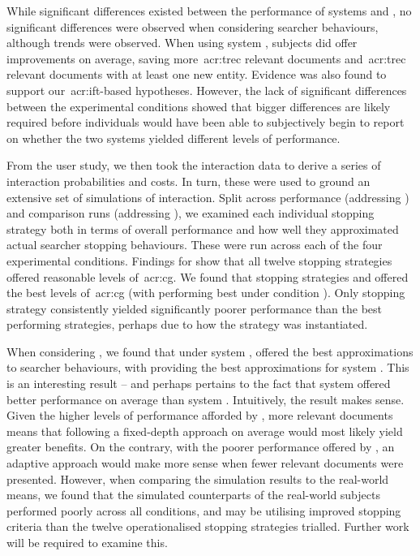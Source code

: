 While significant differences existed between the performance of systems  and , no significant differences were observed when considering searcher behaviours, although trends were observed. When using system , subjects did offer improvements on average, saving more~\gls{acr:trec} relevant documents and~\gls{acr:trec} relevant documents with at least one new entity. Evidence was also found to support our~\gls{acr:ift}-based hypotheses. However, the lack of significant differences between the experimental conditions showed that bigger differences are likely required before individuals would have been able to subjectively begin to report on whether the two systems yielded different levels of performance.

From the user study, we then took the interaction data to derive a series of interaction probabilities and costs. In turn, these were used to ground an extensive set of simulations of interaction. Split across performance (addressing ) and comparison runs (addressing ), we examined each individual stopping strategy both in terms of overall performance and how well they approximated actual searcher stopping behaviours. These were run across each of the four experimental conditions. Findings for  show that all twelve stopping strategies offered reasonable levels of~\gls{acr:cg}. We found that stopping strategies  and  offered the best levels of~\gls{acr:cg} (with  performing best under condition ). Only stopping strategy  consistently yielded significantly poorer performance than the best performing strategies, perhaps due to how the strategy was instantiated.

When considering , we found that under system ,  offered the best approximations to searcher behaviours, with  providing the best approximations for system . This is an interesting result -- and perhaps pertains to the fact that system  offered better performance on average than system . Intuitively, the result makes sense. Given the higher levels of performance afforded by , more relevant documents means that following a fixed-depth approach on average would most likely yield greater benefits. On the contrary, with the poorer performance offered by , an adaptive approach would make more sense when fewer relevant documents were presented. However, when comparing the simulation results to the real-world means, we found that the simulated counterparts of the real-world subjects performed poorly across all conditions, and may be utilising improved stopping criteria than the twelve operationalised stopping strategies trialled. Further work will be required to examine this.

